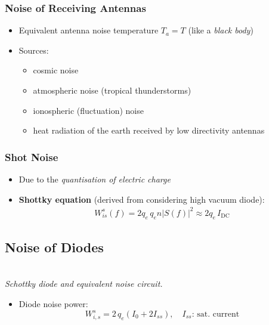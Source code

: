 \subsubsection{Noise of Receiving Antennas}
\begin{itemize}
    \itemsep0pt
    \item Equivalent antenna noise temperature $T_a=T$ (like a \textit{black body})
    \item Sources:
        \begin{itemize}
            \itemsep0pt
            \item cosmic noise
            \item atmospheric noise (tropical thunderstorms)
            \item ionospheric (fluctuation) noise
            \item heat radiation of the earth received by low directivity antennas
        \end{itemize}
\end{itemize}

\subsubsection{Shot Noise}
\begin{itemize}
    \itemsep0pt
    \item Due to the \textit{quantisation of electric charge}
    \item \textbf{Shottky equation} (derived from considering high vacuum diode):
        \begin{align*}
            W_{is}^s(f) = 2q_e\,q_e n |S(f)|^2 \approx 2 q_e\,I_{\mathrm{DC}}
        \end{align*}
\end{itemize}

\subsection{Noise of Diodes}
\begin{center}
    \\
    \textit{Schottky diode and equivalent noise circuit.}
\end{center}
\begin{itemize}
    \item Diode noise power:
    \begin{equation*}
        W_{i,s}^s = 2\,q_e (I_0 + 2I_{ss}), \quad I_{ss}\text{: sat. current}
    \end{equation*}
\end{itemize}


